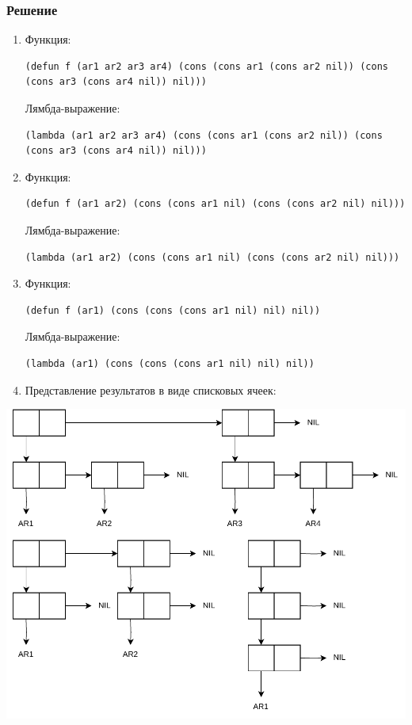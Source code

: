 \documentclass[a4paper,oneside,14pt]{extarticle}
\begin{document}
\subsubsection*{Решение}
\begin{enumerate}
    \item Функция: \begin{lstlisting}[label={lst:}]
(defun f (ar1 ar2 ar3 ar4) (cons (cons ar1 (cons ar2 nil)) (cons (cons ar3 (cons ar4 nil)) nil)))
        \end{lstlisting}
        Лямбда-выражение: \begin{lstlisting}[label={lst:}]
(lambda (ar1 ar2 ar3 ar4) (cons (cons ar1 (cons ar2 nil)) (cons (cons ar3 (cons ar4 nil)) nil)))
        \end{lstlisting}

    \item Функция: \begin{lstlisting}[label={lst:}]
(defun f (ar1 ar2) (cons (cons ar1 nil) (cons (cons ar2 nil) nil)))
        \end{lstlisting}
        Лямбда-выражение: \begin{lstlisting}[label={lst:}]
(lambda (ar1 ar2) (cons (cons ar1 nil) (cons (cons ar2 nil) nil)))
        \end{lstlisting}

    \item Функция: \begin{lstlisting}[label={lst:}]
(defun f (ar1) (cons (cons (cons ar1 nil) nil) nil))
        \end{lstlisting}
        Лямбда-выражение: \begin{lstlisting}[label={lst:}]
(lambda (ar1) (cons (cons (cons ar1 nil) nil) nil))
        \end{lstlisting}

        \newpage
    \item Представление результатов в виде списковых ячеек:
\end{enumerate}

\begin{center}
\includegraphics[width=\textwidth]{img/task5.pdf}
\end{center}
\end{document}
